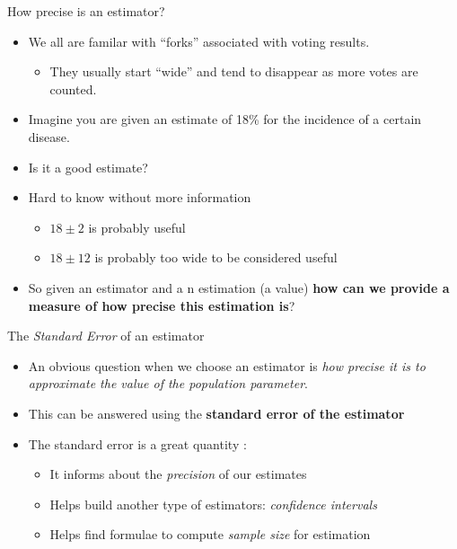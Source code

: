 \documentclass[
  ignorenonframetext,
]{beamer}
\providecommand{\tightlist}{%
  \setlength{\itemsep}{0pt}\setlength{\parskip}{0pt}}
\begin{document}
\begin{frame}{How precise is an estimator?}
\protect\hypertarget{how-precise-is-an-estimator}{}
\begin{itemize}
\tightlist
\item
  We all are familar with ``forks'' associated with voting results.

  \begin{itemize}
  \tightlist
  \item
    They usually start ``wide'' and tend to disappear as more votes are
    counted.
  \end{itemize}
\item
  Imagine you are given an estimate of 18\% for the incidence of a
  certain disease.
\item
  Is it a good estimate?
\item
  Hard to know without more information

  \begin{itemize}
  \tightlist
  \item
    \(18 \pm 2%
    \) is probably useful
  \item
    \(18 \pm 12%
    \) is probably too wide to be considered useful
  \end{itemize}
\item
  So given an estimator and a n estimation (a value) \textbf{how can we
  provide a measure of how precise this estimation is}?
\end{itemize}
\end{frame}

\begin{frame}{The \emph{Standard Error} of an estimator}
\protect\hypertarget{the-standard-error-of-an-estimator}{}
\begin{itemize}
\item
  An obvious question when we choose an estimator is \emph{how precise
  it is to approximate the value of the population parameter}.
\item
  This can be answered using the \textbf{standard error of the
  estimator}
\item
  The standard error is a great quantity :

  \begin{itemize}
  \tightlist
  \item
    It informs about the \emph{precision} of our estimates
  \item
    Helps build another type of estimators: \emph{confidence intervals}
  \item
    Helps find formulae to compute \emph{sample size} for estimation
  \end{itemize}
\end{itemize}
\end{frame}
\end{document}
